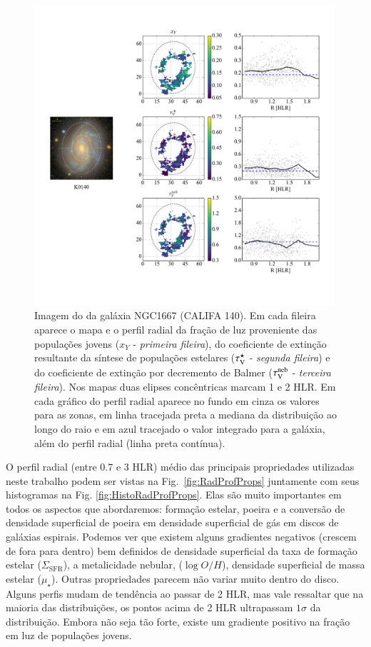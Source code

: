 \begin{figure}
	\centering
	\includegraphics[width=0.99\textwidth]{figuras/K0140_xY_radialProfile_realsample.pdf}
	\caption[Imagem e exemplos de mapas e perfis radiais.]
	{Imagem do \SDSS da galáxia NGC1667 (CALIFA 140). Em cada fileira aparece o mapa e o perfil radial
da fração de luz proveniente das populações jovens ($x_Y$ - \emph{primeira fileira}), do
coeficiente de extinção resultante da síntese de populações estelares ($\tau_{\mathrm{V}}^\star$ - \emph{segunda
fileira}) e do coeficiente de extinção por decremento de Balmer ($\tau_{\mathrm{V}}^{\mathrm{neb}}$ - \emph{terceira
fileira}). Nos mapas duas elipses concêntricas marcam 1 e 2 HLR. Em cada gráfico do perfil radial
aparece no fundo em cinza os valores para as zonas, em linha tracejada preta a mediana da
distribuição ao longo do raio e em azul tracejado o valor integrado para a galáxia, além do perfil
radial (linha preta contínua).}
	\label{fig:K0140xYRadProf}
\end{figure}

O perfil radial (entre 0.7 e 3 HLR) médio das principais propriedades utilizadas neste trabalho
podem ser vistas na Fig.\ \ref{fig:RadProfProps} juntamente com seus histogramas na Fig.
\ref{fig:HistoRadProfProps}. Elas são muito importantes em todos os aspectos que abordaremos:
formação estelar, poeira e a conversão de densidade superficial de poeira em densidade superficial
de gás em discos de galáxias espirais. Podemos ver que existem alguns gradientes negativos (crescem
de fora para dentro) bem definidos de densidade superficial da taxa de formação estelar
($\Sigma_{\mathrm{SFR}}$), a metalicidade nebular, ($\log O/H$), densidade superficial de massa
estelar ($\mu_\star$). Outras propriedades parecem não variar muito dentro do disco. Alguns perfis
mudam de tendência ao passar de 2 HLR, mas vale ressaltar que na maioria das distribuições, os
pontos acima de 2 HLR ultrapassam $1\sigma$ da distribuição. Embora não seja tão forte, existe um
gradiente positivo na fração em luz de populações jovens.

